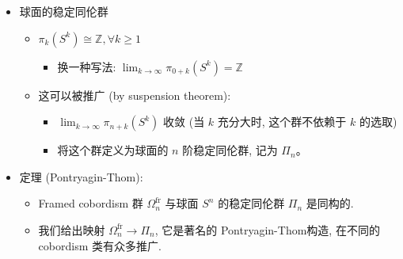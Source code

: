 \documentclass[
]{ctexart}
\providecommand{\tightlist}{%
  \setlength{\itemsep}{0pt}\setlength{\parskip}{0pt}}
\begin{document}
\begin{itemize}
\tightlist
\item
  球面的稳定同伦群

  \begin{itemize}
  \tightlist
  \item
    \(\pi_k\left(S^k\right)\cong\mathbb{Z},\forall k\geq1\)

    \begin{itemize}
    \tightlist
    \item
      换一种写法:
      \(\lim_{ k \to \infty }\pi_{0+k}\left(S^k\right)=\mathbb{Z}\)
    \end{itemize}
  \item
    这可以被推广 (by suspension theorem):

    \begin{itemize}
    \tightlist
    \item
      \(\lim_{ k \to \infty }\pi_{n+k}\left(S^k\right)\) 收敛 (当 \(k\)
      充分大时, 这个群不依赖于 \(k\) 的选取)
    \item
      将这个群定义为球面的 \(n\) 阶稳定同伦群, 记为 \(\Pi_n\)。
    \end{itemize}
  \end{itemize}
\item
  定理 (Pontryagin-Thom):

  \begin{itemize}
  \tightlist
  \item
    Framed cobordism 群 \(\Omega_n^{\text{fr}}\) 与球面 \(S^n\)
    的稳定同伦群 \(\Pi_n\) 是同构的.
  \item
    我们给出映射 \(\Omega_n^{\text{fr}}\to \Pi_n\), 它是著名的
    Pontryagin-Thom构造, 在不同的 cobordism 类有众多推广.


\end{itemize}
\end{itemize}
\end{document}
